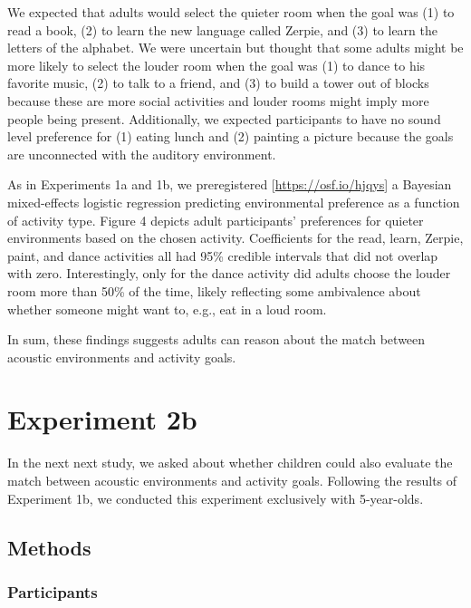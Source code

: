 \documentclass[10pt, letterpaper]{article}
\begin{document}
We expected that adults would select the quieter room when the goal was
(1) to read a book, (2) to learn the new language called Zerpie, and (3)
to learn the letters of the alphabet. We were uncertain but thought that
some adults might be more likely to select the louder room when the goal
was (1) to dance to his favorite music, (2) to talk to a friend, and (3)
to build a tower out of blocks because these are more social activities
and louder rooms might imply more people being present. Additionally, we
expected participants to have no sound level preference for (1) eating
lunch and (2) painting a picture because the goals are unconnected with
the auditory environment.

As in Experiments 1a and 1b, we preregistered
{[}\url{https://osf.io/hjqys}{]} a Bayesian mixed-effects logistic
regression predicting environmental preference as a function of activity
type. Figure 4 depicts adult participants' preferences for quieter
environments based on the chosen activity. Coefficients for the read,
learn, Zerpie, paint, and dance activities all had 95\% credible
intervals that did not overlap with zero. Interestingly, only for the
dance activity did adults choose the louder room more than 50\% of the
time, likely reflecting some ambivalence about whether someone might
want to, e.g., eat in a loud room.

In sum, these findings suggests adults can reason about the match
between acoustic environments and activity goals.

\hypertarget{experiment-2b}{%
\section{Experiment 2b}\label{experiment-2b}}

In the next next study, we asked about whether children could also
evaluate the match between acoustic environments and activity goals.
Following the results of Experiment 1b, we conducted this experiment
exclusively with 5-year-olds.

\hypertarget{methods-3}{%
\subsection{Methods}\label{methods-3}}

\hypertarget{participants-3}{%
\subsubsection{Participants}\label{participants-3}}
\end{document}
